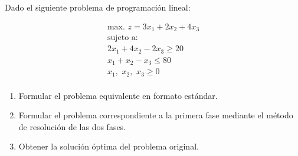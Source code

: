 Dado el siguiente problema de programación lineal:

\begin{equation}
\begin{split}
\mbox{max. } z = 3x_1 + 2x_2 + 4x_3\\
\mbox{sujeto a:}\\
2x_1 + 4x_2 - 2x_3 \geq 20\\
 x_1 +  x_2 -  x_3 \leq 80\\
x_1,\,\,x_2,\,\,x_3\geq 0\\
\end{split}
\end{equation}


\begin{enumerate}
    \item Formular el problema equivalente en formato estándar.

    \item Formular el problema correspondiente a la primera fase mediante el método de resolución de las dos fases.

    \item Obtener la solución óptima del problema original.
    
\end{enumerate}





